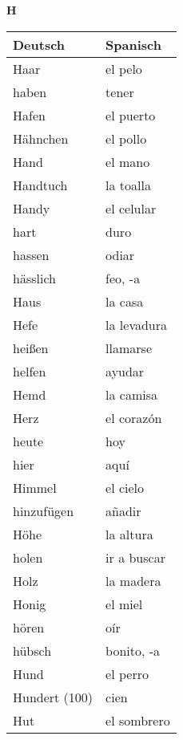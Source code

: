 \begin{flushright}\begin{Huge}\textbf{H}\end{Huge}\end{flushright}

\begin{longtable}{p{} p{}} 
\textbf{Deutsch}     & \textbf{Spanisch}                                       \\ \hline
\hline
\endhead %
Haar & el pelo\\
haben & tener\\
Hafen & el puerto\\
Hähnchen & el pollo\\
Hand & el mano\\
Handtuch & la toalla\\
Handy & el celular\\
hart & duro\\
hassen & odiar\\
hässlich & feo, -a\\
Haus & la casa\\
Hefe & la levadura\\
heißen & llamarse\\
helfen & ayudar\\
Hemd & la camisa\\
Herz  & el corazón \\
heute & hoy\\
hier & aquí\\
Himmel & el cielo\\
hinzufügen & añadir\\
Höhe & la altura \\
holen & ir a buscar\\
Holz & la madera\\
Honig & el miel\\
hören & oír\\
hübsch & bonito, -a\\
Hund & el perro\\
Hundert (100) & cien\\
Hut & el sombrero\\

\end{longtable}
